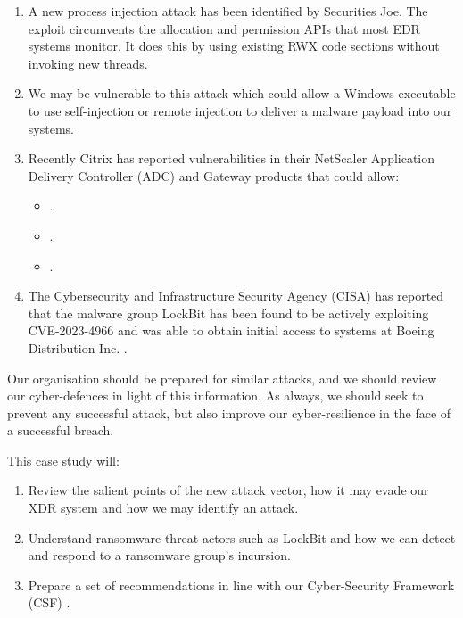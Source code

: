 \begin{enumerate}
\item A new process injection attack has been identified by Securities Joe.  The exploit circumvents the allocation
  and permission APIs that most EDR systems monitor.  It  does this by using existing RWX code sections without invoking
  new threads.
\item We may be vulnerable to this attack which could allow a Windows executable to use self-injection or remote injection to deliver a malware payload into our systems.
\item Recently Citrix has reported vulnerabilities in their NetScaler Application Delivery Controller (ADC) and Gateway products that
  could allow:
  \begin{itemize}
  \item {} \autocite{CVE-2023-3467}.
  \item {} \autocite{CVE-2023-3519}.
  \item {} \autocite{CVE-2023-4966}.
  \end{itemize}
\item The Cybersecurity and Infrastructure Security Agency (CISA) has reported that the malware group LockBit \autocite{CISA:2023a} has
  been found to be actively exploiting CVE-2023-4966 and was able to obtain initial access to systems at Boeing Distribution Inc. \autocite{CISA:2023b}.
\end{enumerate}

Our organisation should be prepared for similar attacks, and we should review our cyber-defences in light of this information.
As always, we should seek to prevent any successful attack, but also improve our cyber-resilience in the face of a successful breach.

This case study will:
\begin{enumerate}
\item Review the salient points of the new attack vector, how it may evade our XDR system and how we may identify an attack.
\item Understand ransomware threat actors such as LockBit and how we can detect and respond to a ransomware group's incursion.
\item Prepare a set of recommendations in line with our Cyber-Security Framework (CSF) \autocite{NIST:2018}.
\end{enumerate}


